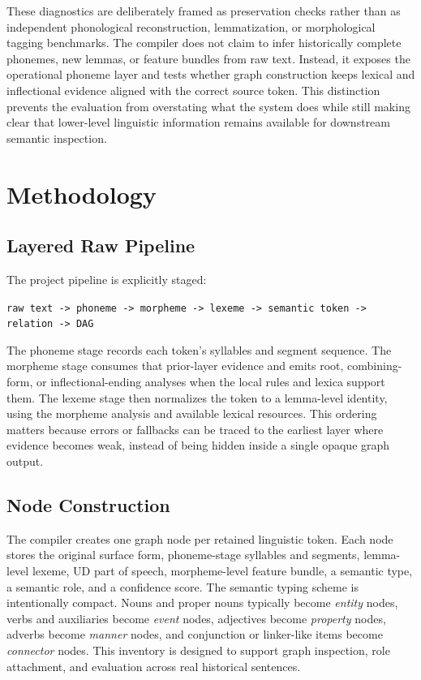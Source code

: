 \documentclass[11pt]{article}
\begin{document}
These diagnostics are deliberately framed as preservation checks rather than as
independent phonological reconstruction, lemmatization, or morphological tagging
benchmarks. The compiler does not claim to infer historically complete phonemes,
new lemmas, or feature bundles from raw text. Instead, it exposes the operational
phoneme layer and tests whether graph construction keeps lexical and
inflectional evidence aligned with the correct source token. This distinction
prevents the evaluation from overstating what the system does while still making
clear that lower-level linguistic information remains available for downstream
semantic inspection.

\section{Methodology}
\subsection{Layered Raw Pipeline}
The project pipeline is explicitly staged:
\begin{center}
\texttt{raw text -> phoneme -> morpheme -> lexeme -> semantic token -> relation -> DAG}
\end{center}
The phoneme stage records each token's syllables and segment sequence. The
morpheme stage consumes that prior-layer evidence and emits root, combining-form,
or inflectional-ending analyses when the local rules and lexica support them.
The lexeme stage then normalizes the token to a lemma-level identity, using the
morpheme analysis and available lexical resources. This ordering matters because
errors or fallbacks can be traced to the earliest layer where evidence becomes
weak, instead of being hidden inside a single opaque graph output.

\subsection{Node Construction}
The compiler creates one graph node per retained linguistic token. Each node
stores the original surface form, phoneme-stage syllables and segments,
lemma-level lexeme, UD part of speech, morpheme-level feature bundle, a semantic
type, a semantic role, and a confidence score. The semantic
typing scheme is intentionally compact. Nouns and proper nouns typically become
\emph{entity} nodes, verbs and auxiliaries become \emph{event} nodes, adjectives
become \emph{property} nodes, adverbs become \emph{manner} nodes, and conjunction
or linker-like items become \emph{connector} nodes. This inventory is designed
to support graph inspection, role attachment, and evaluation across real
historical sentences.
\end{document}
